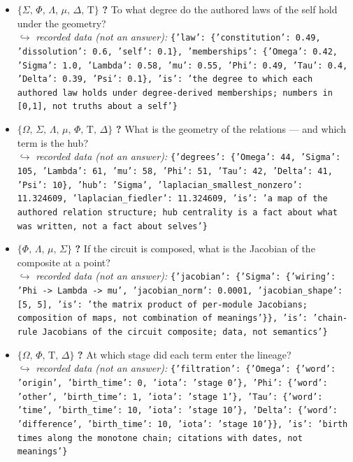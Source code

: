 \documentclass[11pt]{article}
\newcommand{\Tau}{\mathrm{T}}
\begin{document}
\begin{itemize}
\item $\{\Sigma,\,\Phi,\,\Lambda,\,\mu,\,\Delta,\,\Tau\}$ \quad \textbf{?} To what degree do the authored laws of the self hold under the geometry? \\ \hspace*{1em}$\hookrightarrow$ \emph{recorded data (not an answer):} \texttt{\{'law': \{'constitution': 0.49, 'dissolution': 0.6, 'self': 0.1\}, 'memberships': \{'Omega': 0.42, 'Sigma': 1.0, 'Lambda': 0.58, 'mu': 0.55, 'Phi': 0.49, 'Tau': 0.4, 'Delta': 0.39, 'Psi': 0.1\}, 'is': 'the degree to which each authored law holds under degree-derived memberships; numbers in [0,1], not truths about a self'\}}
\item $\{\Omega,\,\Sigma,\,\Lambda,\,\mu,\,\Phi,\,\Tau,\,\Delta\}$ \quad \textbf{?} What is the geometry of the relations — and which term is the hub? \\ \hspace*{1em}$\hookrightarrow$ \emph{recorded data (not an answer):} \texttt{\{'degrees': \{'Omega': 44, 'Sigma': 105, 'Lambda': 61, 'mu': 58, 'Phi': 51, 'Tau': 42, 'Delta': 41, 'Psi': 10\}, 'hub': 'Sigma', 'laplacian\_smallest\_nonzero': 11.324609, 'laplacian\_fiedler': 11.324609, 'is': 'a map of the authored relation structure; hub centrality is a fact about what was written, not a fact about selves'\}}
\item $\{\Phi,\,\Lambda,\,\mu,\,\Sigma\}$ \quad \textbf{?} If the circuit is composed, what is the Jacobian of the composite at a point? \\ \hspace*{1em}$\hookrightarrow$ \emph{recorded data (not an answer):} \texttt{\{'jacobian': \{'Sigma': \{'wiring': 'Phi -> Lambda -> mu', 'jacobian\_norm': 0.0001, 'jacobian\_shape': [5, 5], 'is': 'the matrix product of per-module Jacobians; composition of maps, not combination of meanings'\}\}, 'is': 'chain-rule Jacobians of the circuit composite; data, not semantics'\}}
\item $\{\Omega,\,\Phi,\,\Tau,\,\Delta\}$ \quad \textbf{?} At which stage did each term enter the lineage? \\ \hspace*{1em}$\hookrightarrow$ \emph{recorded data (not an answer):} \texttt{\{'filtration': \{'Omega': \{'word': 'origin', 'birth\_time': 0, 'iota': 'stage 0'\}, 'Phi': \{'word': 'other', 'birth\_time': 1, 'iota': 'stage 1'\}, 'Tau': \{'word': 'time', 'birth\_time': 10, 'iota': 'stage 10'\}, 'Delta': \{'word': 'difference', 'birth\_time': 10, 'iota': 'stage 10'\}\}, 'is': 'birth times along the monotone chain; citations with dates, not meanings'\}}

\end{itemize}
\end{document}
